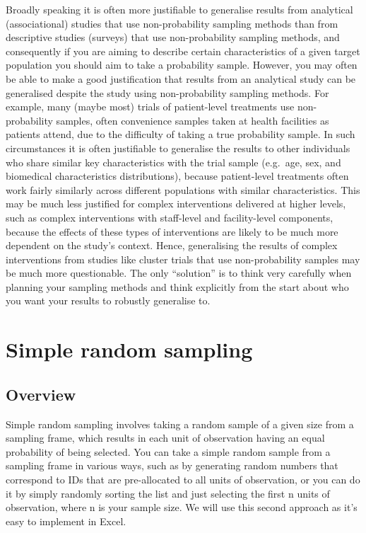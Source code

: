 \documentclass[
]{book}
\begin{document}
Broadly speaking it is often more justifiable to generalise results from analytical (associational) studies that use non-probability sampling methods than from descriptive studies (surveys) that use non-probability sampling methods, and consequently if you are aiming to describe certain characteristics of a given target population you should aim to take a probability sample. However, you may often be able to make a good justification that results from an analytical study can be generalised despite the study using non-probability sampling methods. For example, many (maybe most) trials of patient-level treatments use non-probability samples, often convenience samples taken at health facilities as patients attend, due to the difficulty of taking a true probability sample. In such circumstances it is often justifiable to generalise the results to other individuals who share similar key characteristics with the trial sample (e.g.~age, sex, and biomedical characteristics distributions), because patient-level treatments often work fairly similarly across different populations with similar characteristics. This may be much less justified for complex interventions delivered at higher levels, such as complex interventions with staff-level and facility-level components, because the effects of these types of interventions are likely to be much more dependent on the study's context. Hence, generalising the results of complex interventions from studies like cluster trials that use non-probability samples may be much more questionable. The only ``solution'' is to think very carefully when planning your sampling methods and think explicitly from the start about who you want your results to robustly generalise to.

\hypertarget{simple-random-sampling}{%
\section{Simple random sampling}\label{simple-random-sampling}}

\hypertarget{overview-1}{%
\subsection{Overview}\label{overview-1}}

Simple random sampling involves taking a random sample of a given size from a sampling frame, which results in each unit of observation having an equal probability of being selected. You can take a simple random sample from a sampling frame in various ways, such as by generating random numbers that correspond to IDs that are pre-allocated to all units of observation, or you can do it by simply randomly sorting the list and just selecting the first n units of observation, where n is your sample size. We will use this second approach as it's easy to implement in Excel.
\end{document}
